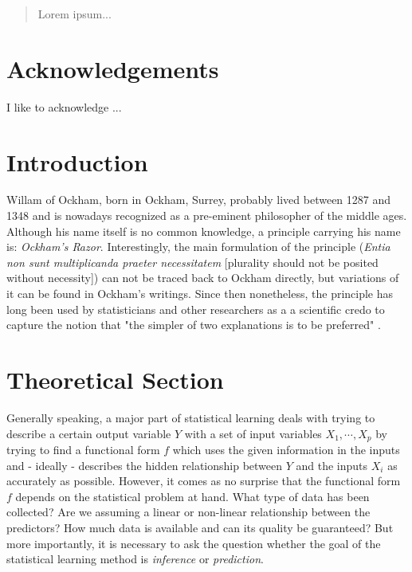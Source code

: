 \documentclass[12pt,a4paper]{article}
\begin{document}
\begin{abstract}
Lorem ipsum...
\end{abstract}

\clearpage

\section*{Acknowledgements}
\thispagestyle{empty}

I like to acknowledge ...

\clearpage

\thispagestyle{plain}
\tableofcontents
\pagebreak
{}

\pagebreak
\section{Introduction}
Willam of Ockham, born in Ockham, Surrey, probably lived between 1287 and 1348 and is nowadays recognized as a pre-eminent philosopher of the middle ages. Although     his name itself is no common knowledge, a principle carrying his name is: \textit{Ockham's Razor}. Interestingly, the main formulation of the principle (\textit{Entia non sunt multiplicanda praeter necessitatem} [plurality should not be posited without necessity]) can not be traced back to Ockham directly, but variations of it can be found in Ockham's writings. Since then nonetheless, the principle has long been used by statisticians and other researchers as a a scientific credo to capture the notion that "the simpler of two explanations is to be preferred" \parencite{Lazar2010}.  

\newpage
\section{Theoretical Section}\label{sec:theorysuper}
Generally speaking, a major part of statistical learning deals with trying to describe a certain output variable $Y$ with a set of input variables $X_1, \cdots, X_p$ by trying to find a functional form $f$ which uses the given information in the inputs and - ideally - describes the hidden relationship between $Y$ and the inputs $X_i$ as accurately as possible. However, it comes as no surprise that the functional form $f$ depends on the statistical problem at hand. What type of data has been collected? Are we assuming a linear or non-linear relationship between the predictors? How much data is available and can its quality be guaranteed? But more importantly, it is necessary to ask the question whether the goal of the statistical learning method is \textit{inference} or \textit{prediction}.\\
\end{document}
